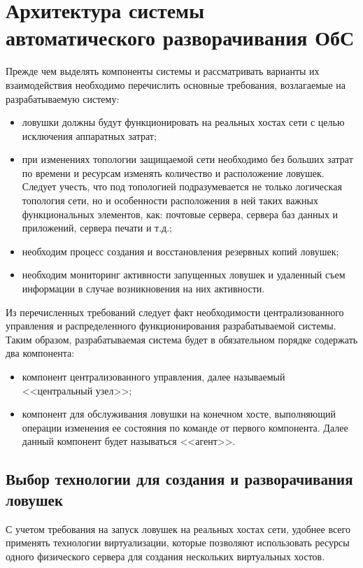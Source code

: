 \section{Архитектура системы автоматического разворачивания ОбС}

Прежде чем выделять компоненты системы и рассматривать варианты их взаимодействия необходимо перечислить основные требования, возлагаемые на разрабатываемую систему:
\begin{itemize}
\item ловушки должны будут функционировать на реальных хостах сети с целью исключения аппаратных затрат;
\item при изменениях топологии защищаемой сети необходимо без больших затрат по времени и ресурсам изменять количество и расположение ловушек. Следует учесть, что под топологией подразумевается не только логическая топология сети, но и особенности расположения в ней таких важных функциональных элементов, как: почтовые сервера, сервера баз данных и приложений, сервера печати и т.д.;
\item необходим процесс создания и восстановления резервных копий ловушек;
\item необходим мониторинг активности запущенных ловушек и удаленный съем информации в случае возникновения на них активности.
\end{itemize}

Из перечисленных требований следует факт необходимости централизованного управления и распределенного функционирования разрабатываемой системы. Таким образом, разрабатываемая система будет в обязательном порядке содержать два компонента:
\begin{itemize}
	\item компонент централизованного управления, далее называемый <<центральный узел>>;
	\item компонент для обслуживания ловушки на конечном хосте, выполняющий операции изменения ее состояния по команде от первого компонента. Далее данный компонент будет называться <<агент>>.
\end{itemize}


\subsection{Выбор технологии для создания и разворачивания ловушек}

С учетом требования на запуск ловушек на реальных хостах сети, удобнее всего применять технологии виртуализации, которые позволяют использовать ресурсы одного физического сервера для создания нескольких виртуальных хостов.

